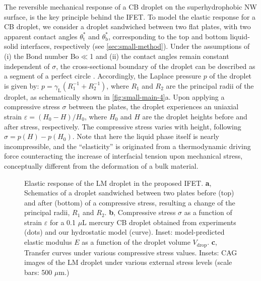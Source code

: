 The reversible mechanical response of a CB droplet on the
superhydrophobic NW surface, is the key principle behind the IFET.
%
To model the elastic response for a CB droplet, we consider a droplet
sandwiched between two flat plates, with two apparent contact angles
\(\theta_{\mathrm{t}}^{*}\) and \(\theta_{\mathrm{b}}^{*}\),
corresponding to the top and bottom liquid-solid interfaces,
respectively (see \autoref{sec:small-method}). Under the assumptions
of (i) the Bond number Bo\(\ll\)1 and (ii) the contact angles remain
constant independent of \(\sigma\), the cross-sectional boundary of
the droplet can be described as a segment of a perfect circle
\autocite{berthier_2012_microdroplet}. Accordingly, the Laplace pressure
\(p\) of the droplet is given by:
\(p = \gamma_{\mathrm{L}} (R_{1}^{-1} + R_{2}^{-1})\), where \(R_{1}\)
and \(R_{2}\) are the principal radii of the droplet, as schematically
shown in \autoref{fig:small-main-4}a. Upon applying a compressive
stress \(\sigma\) between the plates, the droplet experiences an
uniaxial strain \(\varepsilon = (H_{0} - H) / H_{0}\), where \(H_{0}\)
and \(H\) are the droplet heights before and after stress,
respectively. The compressive stress varies with height, following
\(\sigma = p(H) - p(H_{0})\). Note that here the liquid phase itself
is nearly incompressible, and the ``elasticity'' is originated from a
thermodynamic driving force counteracting the increase of interfacial
tension upon mechanical stress, conceptually different from the
deformation of a bulk material.
\begin{figure}[!htbp]
  \centering
  \caption{\label{fig:small-main-4} Elastic response of the LM droplet
    in the proposed IFET. \textbf{a}, Schematics of a droplet
    sandwiched between two plates before (top) and after (bottom) of a
    compressive stress, resulting a change of the principal radii,
    \(R_{1}\) and \(R_{2}\). \textbf{b}, Compressive stress \(\sigma\)
    as a function of strain \(\varepsilon\) for a 0.1 \(\mu\)L mercury
    CB droplet obtained from experiments (dots) and our hydrostatic
    model (curve). Inset: model-predicted elastic modulus \(E\) as a
    function of the droplet volume \(V_{\mathrm{drop}}\). \textbf{c},
    Transfer curves under various compressive stress values. Insets:
    CAG images of the LM droplet under various external stress levels
    (scale bars: 500 \(\mu\)m.)}
\end{figure}

